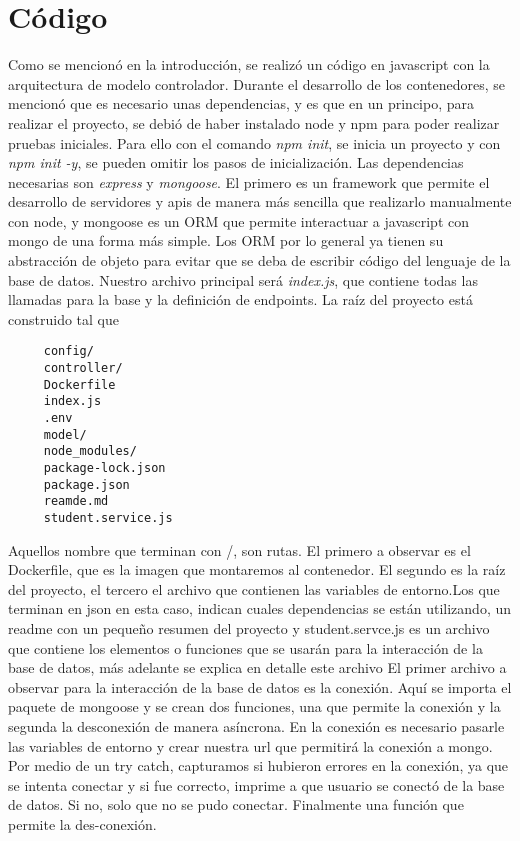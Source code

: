 \documentclass[12pt,a4paper]{report}
\begin{document}
\section{Código}
Como se mencionó en la introducción, se realizó un código en javascript con la arquitectura de modelo controlador. Durante el desarrollo de los contenedores, se mencionó que es necesario unas dependencias, y es que en un principo, para realizar el proyecto, se debió de haber instalado node y npm para poder realizar pruebas iniciales. Para ello con el comando \textit{npm init}, se inicia un proyecto y con \textit{npm init -y}, se pueden omitir los pasos de inicialización. Las dependencias necesarias son \textit{express} y \textit{mongoose}. El primero es un framework que permite el desarrollo de servidores y apis de manera más sencilla que realizarlo manualmente con node, y mongoose es un ORM que permite interactuar a javascript con mongo de una forma más simple. Los ORM por lo general ya tienen su abstracción de objeto para evitar que se deba de escribir código del lenguaje de la base de datos. 
Nuestro archivo principal será \textit{index.js}, que contiene todas las llamadas para la base y la definición de endpoints.
La raíz del proyecto está construido tal que
\begin{verbatim}
     config/
     controller/
     Dockerfile
     index.js
     .env
     model/
     node_modules/
     package-lock.json
     package.json
     reamde.md
     student.service.js
\end{verbatim}
Aquellos nombre que terminan con /, son rutas. El primero a observar es el Dockerfile, que es la imagen que montaremos al contenedor. El segundo es la raíz del proyecto, el tercero el archivo que contienen las variables de entorno.Los que terminan en json en esta caso, indican cuales dependencias se están utilizando, un readme con un pequeño resumen del proyecto y student.servce.js es un archivo que contiene los elementos o funciones que se usarán para la interacción de la base de datos, más adelante se explica en detalle este archivo
El primer archivo a observar para la interacción de la base de datos es la conexión.
Aquí se importa el paquete de mongoose y se crean dos funciones, una que permite la conexión y la segunda la desconexión de manera asíncrona. En la conexión es necesario pasarle las variables de entorno y crear nuestra url que permitirá la conexión a mongo. Por medio de un try catch, capturamos si hubieron errores en la conexión, ya que se intenta conectar y si fue correcto, imprime a que usuario se conectó de la base de datos. Si no, solo que no se pudo conectar. Finalmente una función que permite la des-conexión.
\end{document}
